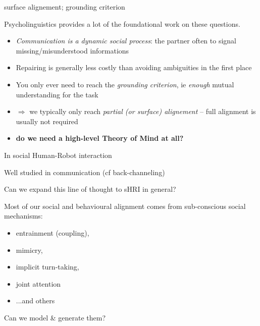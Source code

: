 \documentclass[compress]{beamer}
\begin{document}
{
\begin{frame}{surface alignement; grounding criterion}

    Psycholinguistics provides a lot of the foundational work on these
    questions.

    \begin{itemize}
        \item<+-> \emph{Communication is a dynamic social process}: the partner often to signal
            missing/misunderstood informations
        \item<+-> Repairing is generally less costly than avoiding ambiguities in
            the first place
        \item<+-> You only ever need to reach the \emph{grounding criterion}, ie
            \emph{enough} mutual understanding for the task
        \item<+-> $\Rightarrow$ we typically only reach \emph{partial (or surface)
            alignement} -- full alignment is usually not required
        \item<+-> {\bf do we need a high-level Theory of Mind at all?}
    \end{itemize}
\end{frame}
}

\begin{frame}{In social Human-Robot interaction}
    
    Well studied in communication (cf back-channeling)

    Can we expand this line of thought to sHRI in general?

    Most of our social and behavioural alignment comes from sub-conscious social
    mechanisms:

    \begin{itemize}
        \item entrainment (coupling), 
        \item mimicry, 
        \item implicit turn-taking,
        \item joint attention
        \item ...and others
    \end{itemize}
    \pause
    \begin{center}
    Can we model \& generate them?
    \end{center}
\end{frame}
\end{document}
